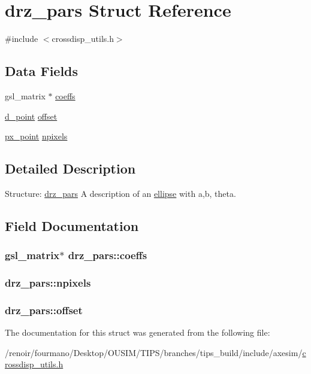 \hypertarget{structdrz__pars}{
\section{drz\_\-pars Struct Reference}
\label{structdrz__pars}
}


{\ttfamily \#include $<$crossdisp\_\-utils.h$>$}\subsection*{Data Fields}
\begin{DoxyCompactItemize}
\item 
gsl\_\-matrix $\ast$ \hyperlink{structdrz__pars_a6ce4c86c0def8601150574a3152c28b8}{coeffs}
\item 
\hyperlink{structd__point}{d\_\-point} \hyperlink{structdrz__pars_a092156b7e550f5555c34ce3717911c3f}{offset}
\item 
\hyperlink{structpx__point}{px\_\-point} \hyperlink{structdrz__pars_a7a541e259e4cfea2796c2a5066aaccf8}{npixels}
\end{DoxyCompactItemize}


\subsection{Detailed Description}
Structure: \hyperlink{structdrz__pars}{drz\_\-pars} A description of an \hyperlink{structellipse}{ellipse} with a,b, theta. 

\subsection{Field Documentation}
\hypertarget{structdrz__pars_a6ce4c86c0def8601150574a3152c28b8}{
\subsubsection[{coeffs}]{\setlength{\rightskip}{0pt plus 5cm}gsl\_\-matrix$\ast$ {\bf drz\_\-pars::coeffs}}}
\label{structdrz__pars_a6ce4c86c0def8601150574a3152c28b8}
\hypertarget{structdrz__pars_a7a541e259e4cfea2796c2a5066aaccf8}{
\subsubsection[{npixels}]{ {\bf drz\_\-pars::npixels}}}
\label{structdrz__pars_a7a541e259e4cfea2796c2a5066aaccf8}
\hypertarget{structdrz__pars_a092156b7e550f5555c34ce3717911c3f}{
\subsubsection[{offset}]{ {\bf drz\_\-pars::offset}}}
\label{structdrz__pars_a092156b7e550f5555c34ce3717911c3f}


The documentation for this struct was generated from the following file:\begin{DoxyCompactItemize}
\item 
/renoir/fourmano/Desktop/OUSIM/TIPS/branches/tips\_\-build/include/axesim/\hyperlink{crossdisp__utils_8h}{crossdisp\_\-utils.h}\end{DoxyCompactItemize}
